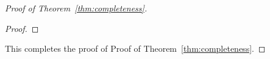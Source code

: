 \begin{proof}[Proof of Theorem~\ref{thm:completeness}]
\begin{proof}
%	
%	
%	
	
	
\end{proof}

  
  This completes the proof of Proof of Theorem~\ref{thm:completeness}.
\end{proof}